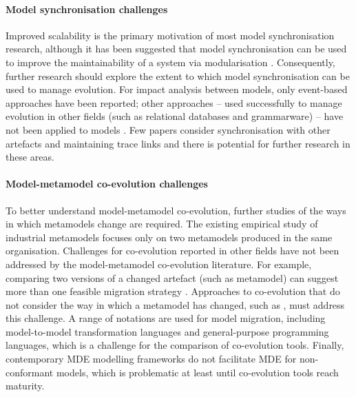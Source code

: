 \paragraph{Model synchronisation challenges} Improved \cc scalability is the primary motivation of most model synchronisation research, although it has been suggested that model synchronisation can be used to improve the maintainability of a system via modularisation \cite{fritzsche08tracing}. Consequently, further research should explore the extent to which model synchronisation can be used to manage evolution. For impact analysis between models, only event-based approaches have been reported; other approaches -- used successfully to manage evolution in other fields (such as relational databases and grammarware) -- have not been applied to models \cite{winkler09survey}. Few papers consider synchronisation with other artefacts and maintaining trace links and there is potential for further research in these areas.

\paragraph{Model-metamodel co-evolution challenges} To better understand model-metamodel co-evolution, further studies of the ways in which metamodels change are required. The \cc existing empirical study of industrial metamodels \cite{herrmannsdoerfer08automatability} focuses only on two metamodels produced in the same organisation. Challenges for co-evolution reported in other fields have not been addressed by the model-metamodel co-evolution literature. For \cc example, comparing two versions of a changed artefact (such as metamodel) can suggest more than one feasible migration strategy \cite{lerner00model}. Approaches to co-evolution that do not consider the way in which a metamodel has changed, such as \cite{cicchetti08automating,garces09managing}, must address this challenge. A range of notations are used for model migration, including model-to-model transformation languages and general-purpose programming languages, which is a challenge for the comparison of co-evolution tools. Finally, contemporary MDE modelling frameworks do not facilitate MDE for non-conformant models, which is problematic at least until co-evolution tools reach maturity.  

